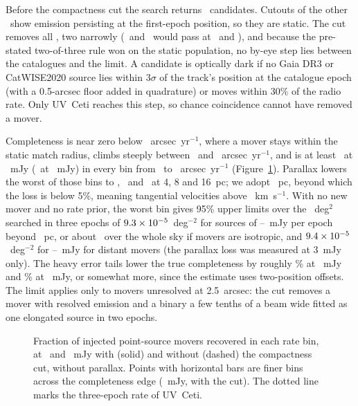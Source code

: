 \documentclass[twocolumn]{aastex631}
\begin{document}
Before the compactness cut the search returns \vpmRealNCandBefore\ candidates. Cutouts of the
other \vpmRealNStaticVetted\ show emission persisting at the first-epoch position, so they are
static. The cut removes all \vpmRealNStaticVetted, two narrowly (\vpmRealMarginAName\
and \vpmRealMarginBName\ would pass at \vpmRealMarginAThr\ and \vpmRealMarginBThr), and because the
pre-stated two-of-three rule won on the static population, no by-eye step lies between the
catalogues and the limit. A candidate is optically dark if no Gaia DR3 or CatWISE2020
\citep{catwise2020} source lies within $3\sigma$ of the track's position at the catalogue epoch
(with a 0.5-arcsec floor added in quadrature) or moves within 30\% of the radio rate. Only UV~Ceti
reaches this step, so chance coincidence cannot have removed a mover.

Completeness is near zero below \vpmRealRateLo~arcsec~yr$^{-1}$, where a mover stays within the
static match radius, climbs steeply between \vpmRealFineEdgeLo\ and
\vpmRealFineEdgeHi~arcsec~yr$^{-1}$, and is at least \vpmRealCompPlxNone\ at \vpmRealFluxThree~mJy (\vpmRealCompDomOneFive\ at
\vpmRealFluxOneFive~mJy) in every bin from \vpmRealRateDomLo\ to \vpmRealRateMax~arcsec~yr$^{-1}$
(Figure~\ref{fig:comp}). Parallax lowers the
worst of those bins to \vpmRealCompPlxFour, \vpmRealCompPlxEight\ and \vpmRealCompPlxSixteen\ at
4, 8 and 16~pc; we adopt \vpmRealPlxDomain~pc, beyond which the loss is below 5\%, meaning
tangential velocities above \vpmRealVtanMin~km~s$^{-1}$. With no new mover and no rate prior, the
worst bin gives 95\% upper limits over the \vpmRealAreaDeg~deg$^2$ searched in three epochs of
$9.3\times10^{-5}$~deg$^{-2}$ for sources of \vpmRealFluxLoThree--\vpmRealFluxHiThree~mJy per
epoch beyond \vpmRealPlxDomain~pc, or about \vpmRealAllSky\ over the whole sky if movers are
isotropic, and $9.4\times10^{-5}$~deg$^{-2}$ for \vpmRealFluxLoOneFive--\vpmRealFluxHiOneFive~mJy
for distant movers (the parallax loss was measured at 3~mJy only). The heavy error tails lower the true completeness by roughly \vpmRealTailBoundThree\% at \vpmRealFluxThree~mJy and \vpmRealTailBoundOneFive\% at
\vpmRealFluxOneFive~mJy, or somewhat more, since the estimate uses two-position offsets. The limit applies only to movers unresolved at 2.5~arcsec: the cut
removes a mover with resolved emission and a binary a few tenths of a beam wide fitted as one
elongated source in two epochs.

\begin{figure}
\caption{Fraction of injected point-source movers recovered in each rate bin, at \vpmRealFluxThree\
and \vpmRealFluxOneFive~mJy with (solid) and without (dashed) the compactness cut, without parallax.
Points with horizontal bars are finer bins across the completeness edge
(\vpmRealFluxThree~mJy, with the cut). The dotted line marks the three-epoch rate of UV~Ceti.}
\label{fig:comp}
\end{figure}
\end{document}
